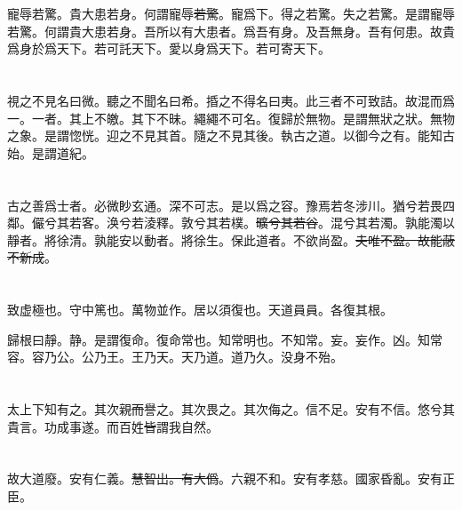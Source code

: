 \documentclass[a5paper]{ctexbook}
\newcommand{\bo}[1]{\textcolor[RGB]{0,255,255}{#1}}
\newcommand{\jian}[1]{\textcolor[RGB]{0,255,0}{#1}}
\def\del{\sout}
\begin{document}
    寵辱若驚。貴大患若身。何謂寵辱\jian{\del{若驚}}。寵爲下。得之若驚。失之若驚。是謂寵辱若驚。何謂貴大患若身。吾所以有大患者。爲吾有身。及吾無身。吾有何患。故\bo{貴爲身於爲天下}。若可\bo{託}天下。愛以身爲天下。若可\bo{寄}天下。

    \chapter{}

    視之不見名曰\bo{微}。聽之不聞名曰希。\bo{捪}之不得名曰\bo{夷}。此三者不可致詰。故混而爲一。\bo{一者}。其上不皦。其下不昧。繩繩不可名。復歸於無物。是謂無狀之狀。無物之象。是謂惚恍。迎之不見其首。隨之不見其後。執古之道。以御今之有。能知古始。是謂道紀。

    \chapter{}

    古之善爲士者。\jian{必}微\bo{眇}玄通。深不可\jian{志}。\jian{是以爲之容}。豫焉若冬涉川。猶兮若畏四鄰。儼兮其若\jian{客}。涣兮若\bo{淩釋}。敦兮其若樸。\jian{\del{曠兮其若谷}}。混兮其若濁。\jian{孰能濁以靜者。將徐清}。\jian{孰能安以動者。將徐生}。保此道者。不欲\jian{尚}盈。\jian{\del{夫唯不盈。故能蔽不新成}}。

    \chapter{}

    致虚極\jian{也}。守\jian{中}篤\jian{也}。萬物並作。\jian{居以須復也}。\jian{天道員員。各復其根}。

    歸根曰靜。\bo{静}。是謂復命。\bo{復命常也。知常明也}。不知常。\bo{妄}。妄作。凶。知常容。容乃公。公乃王。王乃天。天乃道。道乃久。没身不殆。

    \chapter{}

    太上下知有之。其次親\jian{\del{而}}譽之。其次畏之。其次侮之。\bo{信不足。安有不信}。悠兮其貴言。功成事遂。\jian{而}百姓\jian{\del{皆}}謂我自然。

    \chapter{}

    \jian{故}大道廢。\jian{安}有仁義。\jian{\del{慧智出。有大僞}}。六親不和。\jian{安}有孝慈。國家昏亂。\jian{安}有\jian{正}臣。
\end{document}
